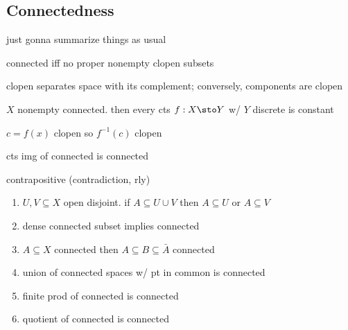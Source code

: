\subsection{Connectedness}
just gonna summarize things as usual

\begin{prop}
    connected iff no proper nonempty clopen subsets
\end{prop}

\begin{pf}[source=Primary Source Material]
    clopen separates space with its complement;
    conversely, components are clopen
\end{pf}

\begin{prop}
    $X$ nonempty connected.
    then every cts $f:X\sto Y$ w/ $Y$ discrete is constant
\end{prop}

\begin{pf}[source=Primary Source Material]
    $c = f(x)$ clopen so $f^{-1}(c)$ clopen
\end{pf}

\begin{prop}[type=Theorem]
    cts img of connected is connected
\end{prop}

\begin{pf}[source=Primary Source Material]
    contrapositive (contradiction, rly)
\end{pf}

\newpage
\begin{prop}
    \vspace{-0.275in}
    \begin{enumerate}[(\alph*)]
        \item $U,V\subseteq X$ open disjoint.
            if $A\subseteq U\cup V$ then $A\subseteq U$ or $A\subseteq V$
        \item dense connected subset implies connected
        \item $A\subseteq X$ connected then $A\subseteq B\subseteq \bar{A}$
            connected
        \item union of connected spaces w/ pt in common is connected
        \item finite prod of connected is connected
        \item quotient of connected is connected
    \end{enumerate}
\end{prop}

